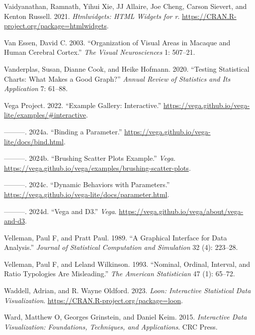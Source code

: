 \documentclass[
]{book}
\newlength{\cslhangindent}
\newenvironment{CSLReferences}[2] %
 {\begin{list}{}{%
  \setlength{\itemindent}{0pt}
  \setlength{\leftmargin}{0pt}
  \setlength{\parsep}{0pt}
  \ifodd #1
   \setlength{\leftmargin}{\cslhangindent}
   \setlength{\itemindent}{-1\cslhangindent}
  \fi
  \setlength{\itemsep}{#2\baselineskip}}}
 {\end{list}}
\begin{document}
\begin{CSLReferences}{1}{0}
Vaidyanathan, Ramnath, Yihui Xie, JJ Allaire, Joe Cheng, Carson Sievert, and Kenton Russell. 2021. \emph{Htmlwidgets: HTML Widgets for r}. \url{https://CRAN.R-project.org/package=htmlwidgets}.

Van Essen, David C. 2003. {``Organization of Visual Areas in Macaque and Human Cerebral Cortex.''} \emph{The Visual Neurosciences} 1: 507--21.

Vanderplas, Susan, Dianne Cook, and Heike Hofmann. 2020. {``Testing Statistical Charts: What Makes a Good Graph?''} \emph{Annual Review of Statistics and Its Application} 7: 61--88.

Vega Project. 2022. {``{Example Gallery: Interactive}.''} \url{https://vega.github.io/vega-lite/examples/\#interactive}.

---------. 2024a. {``{Binding a Parameter}.''} \url{https://vega.github.io/vega-lite/docs/bind.html}.

---------. 2024b. {``Brushing Scatter Plots Example.''} \emph{Vega}. \url{https://vega.github.io/vega/examples/brushing-scatter-plots}.

---------. 2024c. {``{Dynamic Behaviors with Parameters}.''} \url{https://vega.github.io/vega-lite/docs/parameter.html}.

---------. 2024d. {``Vega and D3.''} \emph{Vega}. \url{https://vega.github.io/vega/about/vega-and-d3}.

Velleman, Paul F, and Pratt Paul. 1989. {``A Graphical Interface for Data Analysis.''} \emph{Journal of Statistical Computation and Simulation} 32 (4): 223--28.

Velleman, Paul F, and Leland Wilkinson. 1993. {``Nominal, Ordinal, Interval, and Ratio Typologies Are Misleading.''} \emph{The American Statistician} 47 (1): 65--72.

Waddell, Adrian, and R. Wayne Oldford. 2023. \emph{Loon: Interactive Statistical Data Visualization}. \url{https://CRAN.R-project.org/package=loon}.

Ward, Matthew O, Georges Grinstein, and Daniel Keim. 2015. \emph{Interactive Data Visualization: Foundations, Techniques, and Applications}. CRC Press.


\end{CSLReferences}
\end{document}
